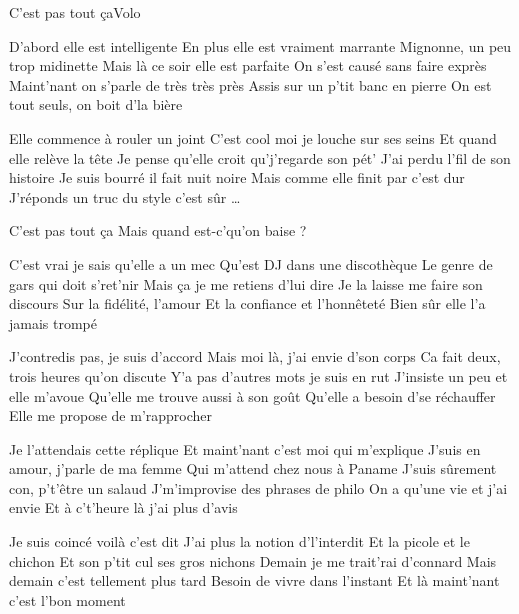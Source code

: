\begin{Song}{C'est pas tout ça}{Volo}

\begin{multicols}{2}

\begin{Verse}
D'abord elle est intelligente
En plus elle est vraiment marrante
Mignonne, un peu trop midinette
Mais là ce soir elle est parfaite
On s'est causé sans faire exprès
Maint'nant on s'parle de très très près
Assis sur un p'tit banc en pierre
On est tout seuls, on boit d'la bière
\espaceInterStrophe

Elle commence à rouler un joint
C'est cool moi je louche sur ses seins
Et quand elle relève la tête
Je pense qu'elle croit qu'j'regarde son pét'
J'ai perdu l'fil de son histoire
Je suis bourré il fait nuit noire
Mais comme elle finit par \og c'est dur \fg
J'réponds un truc du style \og c'est sûr \fg\dots
\end{Verse}
\espaceInterStrophe

\begin{Chorus}
C'est pas tout ça
Mais quand est-c'qu'on baise ?
\bis
\end{Chorus}
\espaceInterStrophe

\begin{Verse}
C'est vrai je sais qu'elle a un mec
Qu'est DJ dans une discothèque
Le genre de gars qui doit s'ret'nir
Mais ça je me retiens d'lui dire
Je la laisse me faire son discours
Sur la fidélité, l'amour
Et la confiance et l'honnêteté
Bien sûr elle l'a jamais trompé
\espaceInterStrophe

J'contredis pas, je suis d'accord
Mais moi là, j'ai envie d'son corps
Ca fait deux, trois heures qu'on discute
Y'a pas d'autres mots je suis en rut
J'insiste un peu et elle m'avoue
Qu'elle me trouve aussi à son goût
Qu'elle a besoin d'se réchauffer
Elle me propose de m'rapprocher
\end{Verse}
\columnbreak

\aurefrain
\espaceInterStrophe

\begin{Verse}
Je l'attendais cette réplique
Et maint'nant c'est moi qui m'explique
J'suis en amour, j'parle de ma femme
Qui m'attend chez nous à Paname
J'suis sûrement con, p't'être un salaud
J'm'improvise des phrases de philo
On a qu'une vie et j'ai envie
Et à c't'heure là j'ai plus d'avis
\espaceInterStrophe

Je suis coincé voilà c'est dit
J'ai plus la notion d'l'interdit
Et la picole et le chichon
Et son p'tit cul ses gros nichons
Demain je me trait'rai d'connard
Mais demain c'est tellement plus tard
Besoin de vivre dans l'instant
Et là maint'nant c'est l'bon moment
\end{Verse}
\espaceInterStrophe


\end{multicols}
\end{Song}
